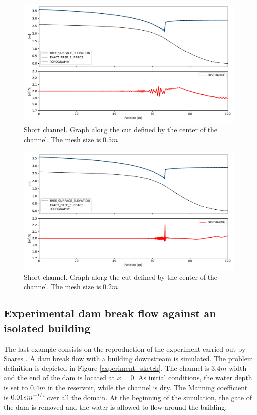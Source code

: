 \documentclass[a4paper,12pt]{elsarticle}
\begin{document}
\begin{figure}
    \centering
    \includegraphics[width=\textwidth]{img/jump/mesh_0.5.pdf}
    \caption{Short channel. Graph along the cut defined by the center of the channel. The mesh size is $0.5m$}
    \label{mac_donald_shock_graph_5}
\end{figure}

\begin{figure}
    \centering
    \includegraphics[width=\textwidth]{img/jump/mesh_0.2.pdf}
    \caption{Short channel. Graph along the cut defined by the center of the channel. The mesh size is $0.2m$}
    \label{mac_donald_shock_graph_2}
\end{figure}


\subsection{Experimental dam break flow against an isolated building}

The last example consists on the reproduction of the experiment carried out by Soares \cite{soares2007}.
A dam break flow with a building downstream is simulated. The problem definition is depicted in Figure \ref{experiment_sketch}. The channel is $3.4m$ width and the end of the dam is located at $x=0$.
As initial conditions, the water depth is set to $0.4m$ in the reservoir, while the channel is dry. The Manning coefficient is $0.01sm^{-\sfrac{1}{3}}$ over all the domain.
At the beginning of the simulation, the gate of the dam is removed and the water is allowed to flow around the building.
\end{document}
